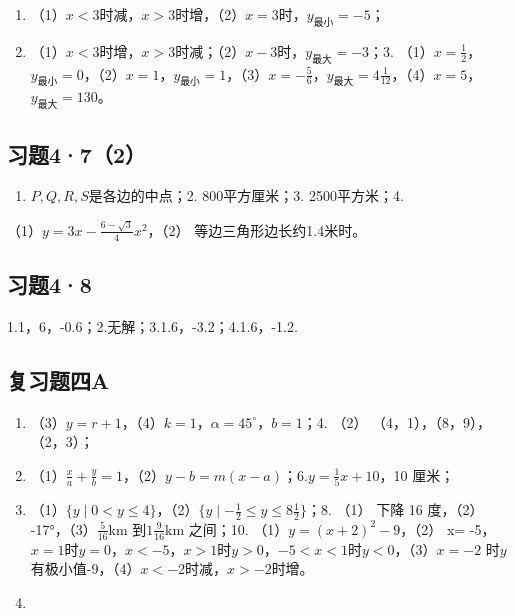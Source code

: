 \begin{enumerate}
\item
  （1）\(x < 3\)时减，\(x > 3\)时增，（2）\(x = 3\)时，\(y_{\text{最小}} = -5\)；
\item
  （1）\(x < 3\)时增，\(x > 3\)时减；（2）\(x - 3\)时，\(y_{\text{最大}} = -3\)；3.
  （1）\(x = \frac{1}{2}\)，\(y_{\text{最小}} = 0\)，（2）\(x = 1\)，\(y_{\text{最小}} = 1\)，（3）\(x = -\frac{5}{6}\)，\(y_{\text{最大}} = 4\frac{1}{12}\)，（4）\(x = 5\)，\(y_{\text{最大}} = 130\)。
\end{enumerate}

\subsection{习题4·7（2）}

\begin{enumerate}[start=1]
\item
  \(P, Q, R, S\)是各边的中点；2. 800平方厘米；3. 2500平方米；4.
\end{enumerate}
（1）\(y = 3x - \frac{6 - \sqrt{3}}{4} x^2\)，（2）
等边三角形边长约1.4米时。

\subsection{习题4·8}

1.1，6，-0.6；2.无解；3.1.6，-3.2；4.1.6，-1.2.

\subsection{复习题四A}

\begin{enumerate}[start=3]
\item
  （3）\(y = r + 1\)，（4）\(k = 1\)，\(\alpha = 45^\circ\)，\(b = 1\)；4.
  （2） （4，1），（8，9），（2，3）；
\item
  （1）\(\frac{x}{a} + \frac{y}{b} = 1\)，（2）\(y - b = m(x - a)\)；6.\(y = \frac{1}{5} x + 10\)，10
  厘米；
\item
  （1）\(\{y \mid 0 < y \leqslant 4\}\)，（2）\(\{y \mid -\frac{1}{2} \leqslant y \leqslant 8 \frac{1}{2}\}\)；8.
  （1） 下降 16 度，（2） -17°，（3）\(\frac{5}{16}\)km
  到\(1\frac{9}{16}\)km 之间；10. （1）\(y=(x+2)^{2}-9\)，（2） x=
  -5，\(x = 1\)时\(y = 0\)，\(x < -5\)，\(x > 1\)时\(y > 0\)，\(-5 < x < 1\)时\(y < 0\)，（3）\(x = -2\)
  时\(y\)有极小值-9，（4）\(x < -2\)时减，\(x > -2\)时增。
\item
\end{enumerate}

